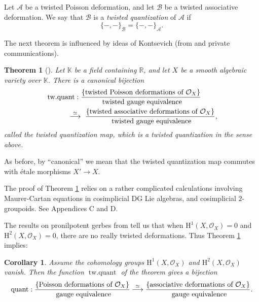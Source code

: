 \documentclass{conm-p-l}
\newtheorem{thm}[equation]{Theorem}
\newtheorem{cor}[equation]{Corollary}
\theoremstyle{definition}
\numberwithin{equation}{section}
\newcommand{\iso}{\stackrel{\simeq}{\longrightarrow}}
\newcommand{\opn}{\operatorname}
\newcommand{\mcal}[1]{\mathcal{#1}}
\newcommand{\mrm}[1]{\mathrm{#1}}
\newcommand{\mbb}[1]{\mathbb{#1}}
\newcommand{\tup}[1]{\textup{#1}}
\newcommand{\bsym}[1]{\boldsymbol{#1}}
\newcommand{\K}{\mbb{K}}
\begin{document}
Let $\bsym{\mcal{A}}$ be a twisted Poisson deformation, and 
let $\bsym{\mcal{B}}$ be a twisted associative deformation. We say 
that $\bsym{\mcal{B}}$ is a {\em twisted quantization} of
$\bsym{\mcal{A}}$ if 
\[ \{ -,- \}_{\bsym{\mcal{B}}} = \{ -,- \}_{\bsym{\mcal{A}}} . \]

The next theorem is influenced by ideas of Kontsevich (from 
\cite{Ko3} and private communications).

\begin{thm}[\cite{Ye5}]  \label{thm_new}
Let $\K$ be a field containing $\mbb{R}$, and let $X$ be a
smooth algebraic variety over $\K$.
There is a canonical bijection 
\[ \begin{aligned}
& \opn{tw{.}quant} : \frac{ \{ \tup{twisted Poisson deformations of 
$\mcal{O}_{X}$} \} }
{\tup{ twisted gauge equivalence}} \\
&   \hspace{3em} \iso \ 
\frac{ \{ \tup{twisted associative deformations of 
$\mcal{O}_X$} \} }{\tup{ twisted gauge equivalence}} ,
\end{aligned} \] 
called the {\em twisted quantization map}, which is a twisted quantization in
the sense above.
\end{thm} 

As before, by ``canonical'' we mean that the twisted quantization map
commutes with \'etale morphisms $X' \to X$.

The proof of Theorem \ref{thm_new} relies on a rather complicated
calculations involving Maurer-Cartan equations in cosimplicial DG Lie
algebras, and cosimplicial $2$-groupoids. See Appendices C and D. 

The results on pronilpotent gerbes from \cite{Ye6} tell us that 
when $\mrm{H}^1(X, \mcal{O}_{X}) = 0$ and 
$\mrm{H}^2(X, \mcal{O}_{X}) = 0$, there are no really twisted deformations. 
Thus Theorem \ref{thm_new} implies:

\begin{cor}  \label{cor_new}
Assume the cohomology groups 
$\mrm{H}^1(X, \mcal{O}_{X})$ and $\mrm{H}^2(X, \mcal{O}_{X})$ vanish.
Then the function $\opn{tw{.}quant}$ of the theorem gives a bijection
\[ \opn{quant} : \frac{ \{ \tup{Poisson deformations of 
$\mcal{O}_{X}$} \} }
{\tup{ gauge equivalence}} 
\iso
\frac{ \{ \tup{associative deformations of 
$\mcal{O}_X$} \} }{\tup{ gauge equivalence}} .
\] 
\end{cor} 
\end{document}
